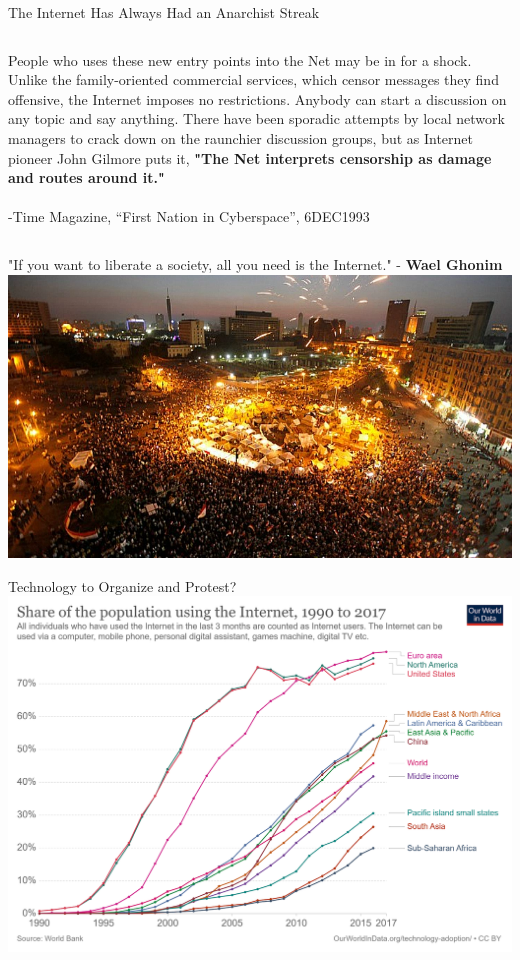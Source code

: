 \documentclass[nobackground,dvipsnames,table]{beamer}
\begin{document}
\begin{frame}{The Internet Has Always Had an Anarchist Streak}
\begin{columns}[c]
            People who uses these new entry points into the Net may be in for a shock. Unlike the family-oriented commercial services, which censor messages they find offensive, the Internet imposes no restrictions. Anybody can start a discussion on any topic and say anything. There have been sporadic attempts by local network managers to crack down on the raunchier discussion groups, but as Internet pioneer John Gilmore puts it, \textbf{"The Net interprets censorship as damage and routes around it."}\\~\\
            
            -Time Magazine, “First Nation in Cyberspace”, 6DEC1993
    \end{columns}
\end{frame}

\begin{frame}{"If you want to liberate a society, all you need is the Internet." - \textbf{Wael Ghonim}}
    \includegraphics[width=\textwidth]{protest}
\end{frame}

\begin{frame}{Technology to Organize and Protest?}
    \includegraphics[width=\textwidth]{percent-using-internet}
\end{frame}
\end{document}
